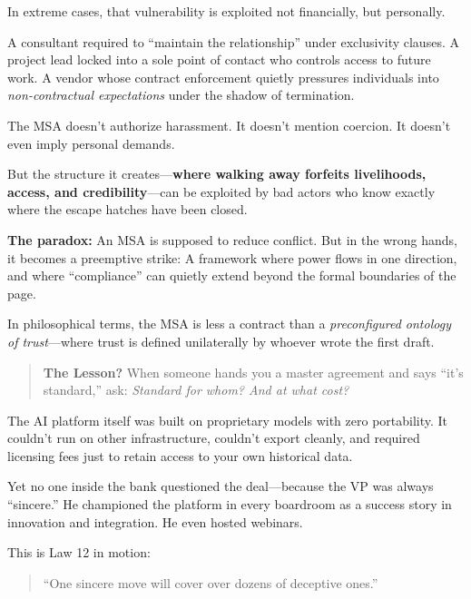 \begin{tcolorbox}[colback=blue!5!white, colframe=blue!50!black, breakable,
  title={Philosophical Sidebar: The Master Service Agreement as a Weapon of Control}]
\medskip

In extreme cases, that vulnerability is exploited not financially, but personally.

A consultant required to “maintain the relationship” under exclusivity clauses.  
A project lead locked into a sole point of contact who controls access to future work.  
A vendor whose contract enforcement quietly pressures individuals into \textit{non-contractual expectations} under the shadow of termination.

\medskip

The MSA doesn’t authorize harassment.  
It doesn’t mention coercion.  
It doesn’t even imply personal demands.

But the structure it creates—\textbf{where walking away forfeits livelihoods, access, and credibility}—can be exploited by bad actors who know exactly where the escape hatches have been closed.

\medskip

\textbf{The paradox:}  
An MSA is supposed to reduce conflict.  
But in the wrong hands, it becomes a preemptive strike:  
A framework where power flows in one direction, and where “compliance” can quietly extend beyond the formal boundaries of the page.

\medskip

In philosophical terms, the MSA is less a contract than a \textit{preconfigured ontology of trust}—where trust is defined unilaterally by whoever wrote the first draft.

\medskip

\begin{quote}
\textbf{The Lesson?} When someone hands you a master agreement and says “it’s standard,” ask: \textit{Standard for whom? And at what cost?}
\end{quote}

\end{tcolorbox}


The AI platform itself was built on proprietary models with zero portability. It couldn’t run on other infrastructure, couldn’t export cleanly, and required licensing fees just to retain access to your own historical data.

Yet no one inside the bank questioned the deal—because the VP was always “sincere.” He championed the platform in every boardroom as a success story in innovation and integration.  
He even hosted webinars.

\medskip

This is Law 12 in motion:
\begin{quote}
“One sincere move will cover over dozens of deceptive ones.”
\end{quote}

